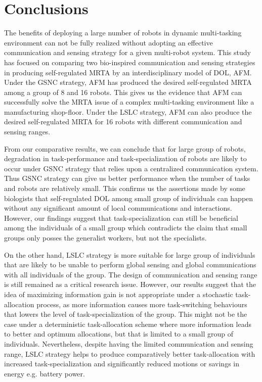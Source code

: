 \chapter{Conclusions}
The benefits of deploying a large number of robots in dynamic multi-tasking environment can not be fully realized without adopting an effective communication and sensing strategy for a given multi-robot system. This study has focused on comparing two bio-inspired  communication and sensing strategies in producing self-regulated MRTA by an interdisciplinary model of DOL, AFM. Under the GSNC strategy, AFM has produced the desired self-regulated MRTA among a group of 8 and 16 robots. This gives us the evidence that AFM can successfully solve the MRTA issue of a complex multi-tasking environment like a manufacturing shop-floor. Under the LSLC strategy, AFM can also produce the desired self-regulated MRTA for 16 robots with different communication and sensing ranges.

From our comparative results, we can conclude that for large group of robots,  degradation in  task-performance and task-specialization of robots are likely to occur  under GSNC strategy that relies upon a centralized communication system. Thus GSNC strategy can give us better performance when the number of tasks and robots are relatively small. This confirms us the assertions made by some biologists that self-regulated DOL among small group of individuals can happen without any significant amount of local communications and interactions. However, our findings suggest that task-specialization can still be beneficial among the individuals of a small group which contradicts the claim that small groups only posses the generalist workers, but not the specialists.

On the other hand, LSLC strategy is more suitable for large group of individuals that are likely to be unable to perform global sensing and global communications with all individuals of the group. The design of communication and sensing range is still remained as a critical research issue. However, our results suggest that the idea of maximizing information gain is not appropriate under a stochastic task-allocation process, as more information causes more task-switching behaviours that lowers the level of task-specialization of the group. This might not be the case under a deterministic task-allocation scheme where more information leads to better and optimum allocations, but that is limited to a small group of individuals. Nevertheless, despite having the limited communication and sensing range, LSLC strategy helps to produce comparatively better task-allocation with increased task-specialization and significantly reduced motions or savings in energy e.g. battery power.

